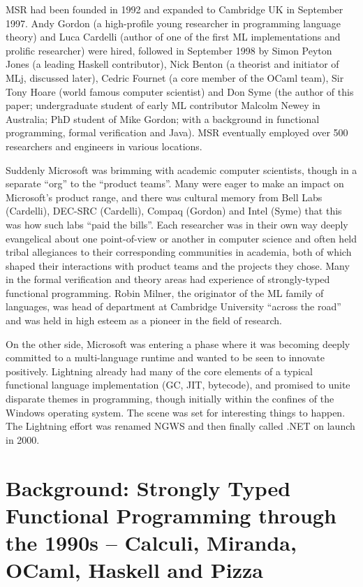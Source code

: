 \documentclass[acmsmall,review]{acmart}\settopmatter{printfolios=true,printccs=false,printacmref=false}
\begin{document}
MSR had been founded in 1992 and expanded to Cambridge UK in September 1997. Andy Gordon (a high-profile young researcher in programming language theory) and Luca Cardelli (author of one of the first ML implementations and prolific researcher) were hired, followed in September 1998 by Simon Peyton Jones (a leading Haskell contributor), Nick Benton (a theorist and initiator of MLj, discussed later), Cedric Fournet (a core member of the OCaml team), Sir Tony Hoare (world famous computer scientist) and Don Syme (the author of this paper; undergraduate student of early ML contributor Malcolm Newey in Australia; PhD student of Mike Gordon; with a background in functional programming, formal verification and Java). MSR eventually employed over 500 researchers and engineers in various locations.  

Suddenly Microsoft was brimming with academic computer scientists, though in a separate “org” to the “product teams”.  Many were eager to make an impact on Microsoft’s product range, and there was cultural memory from Bell Labs (Cardelli), DEC-SRC (Cardelli), Compaq (Gordon) and Intel (Syme) that this was how such labs “paid the bills”.  Each researcher was in their own way deeply evangelical about one point-of-view or another in computer science and often held tribal allegiances to their corresponding communities in academia, both of which shaped their interactions with product teams and the projects they chose. Many in the formal verification and theory areas had experience of strongly-typed functional programming. Robin Milner, the originator of the ML family of languages, was head of department at Cambridge University “across the road” and was held in high esteem as a pioneer in the field of research. 

On the other side, Microsoft was entering a phase where it was becoming deeply committed to a multi-language runtime and wanted to be seen to innovate positively.  Lightning already had many of the core elements of a typical functional language implementation (GC, JIT, bytecode), and promised to unite disparate themes in programming, though initially within the confines of the Windows operating system. The scene was set for interesting things to happen. The Lightning effort was renamed NGWS and then finally called .NET on launch in 2000.  

\section*{Background: Strongly Typed Functional Programming through the 1990s – Calculi, Miranda, OCaml, Haskell and Pizza}
\end{document}
